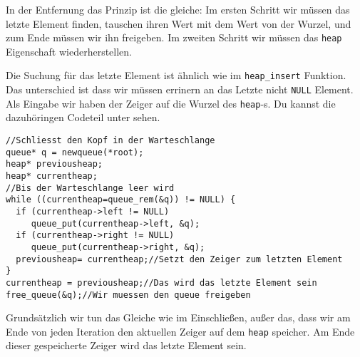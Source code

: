 In der Entfernung das Prinzip ist die gleiche: Im ersten Schritt wir müssen das letzte Element 
finden, tauschen ihren Wert mit dem Wert von der Wurzel, und zum Ende müssen wir ihn
freigeben. Im zweiten Schritt wir müssen das \texttt{heap} Eigenschaft wiederherstellen.

Die Suchung für das letzte Element ist ähnlich wie im \texttt{heap\_insert} Funktion. Das
unterschied ist dass wir müssen errinern an das Letzte nicht \texttt{NULL} Element. Als 
Eingabe wir haben der Zeiger auf die Wurzel des \texttt{heap}-s. Du kannst die dazuhöringen
Codeteil unter sehen.
\begin{lstlisting}
//Schliesst den Kopf in der Warteschlange
queue* q = newqueue(*root);
heap* previousheap;
heap* currentheap;
//Bis der Warteschlange leer wird
while ((currentheap=queue_rem(&q)) != NULL) {
  if (currentheap->left != NULL)
     queue_put(currentheap->left, &q);
  if (currentheap->right != NULL)
     queue_put(currentheap->right, &q);
  previousheap= currentheap;//Setzt den Zeiger zum letzten Element
}
currentheap = previousheap;//Das wird das letzte Element sein
free_queue(&q);//Wir muessen den queue freigeben
\end{lstlisting}

Grundsätzlich wir tun das Gleiche wie im Einschließen, außer das, dass wir am Ende 
von jeden Iteration den aktuellen Zeiger auf dem \texttt{heap} speicher. Am Ende 
dieser gespeicherte Zeiger wird das letzte Element sein. 

